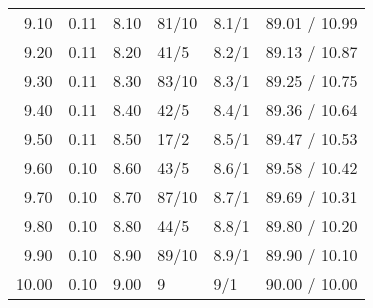 \begin{longtable}{rrrlll}
  9.10 & 0.11 & 8.10 & 81/10 & 8.1/1 & 89.01 / 10.99 \\ 
  9.20 & 0.11 & 8.20 & 41/5 & 8.2/1 & 89.13 / 10.87 \\ 
  9.30 & 0.11 & 8.30 & 83/10 & 8.3/1 & 89.25 / 10.75 \\ 
  9.40 & 0.11 & 8.40 & 42/5 & 8.4/1 & 89.36 / 10.64 \\ 
  9.50 & 0.11 & 8.50 & 17/2 & 8.5/1 & 89.47 / 10.53 \\ 
  9.60 & 0.10 & 8.60 & 43/5 & 8.6/1 & 89.58 / 10.42 \\ 
  9.70 & 0.10 & 8.70 & 87/10 & 8.7/1 & 89.69 / 10.31 \\ 
  9.80 & 0.10 & 8.80 & 44/5 & 8.8/1 & 89.80 / 10.20 \\ 
  9.90 & 0.10 & 8.90 & 89/10 & 8.9/1 & 89.90 / 10.10 \\ 
  10.00 & 0.10 & 9.00 & 9 & 9/1 & 90.00 / 10.00 \\ 
   \hline
\hline
\end{longtable}
